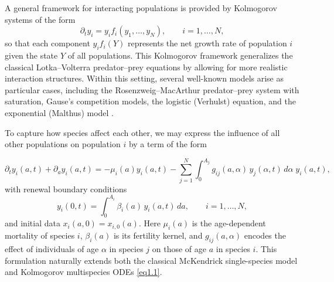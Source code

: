 \documentclass[10pt, a4paper]{amsart}
\theoremstyle{plain}
\theoremstyle{definition}
\theoremstyle{remark}
\numberwithin{equation}{section}
\begin{document}
A general framework for interacting populations is provided by Kolmogorov systems of the form
\begin{equation}\label{eq1.1}
\partial_t y_i= y_i f_i(y_1,\dots,y_N), \qquad i=1,\dots,N,
\end{equation}
so that each component $y_i f_i(Y)$ represents the net growth rate of population $i$ given the state $Y$ of all populations. This Kolmogorov framework generalizes the classical Lotka–Volterra predator–prey equations by allowing for more realistic interaction structures. Within this setting, several well-known models arise as particular cases, including the Rosenzweig–MacArthur predator–prey system with saturation, Gause’s competition models, the logistic (Verhulst) equation, and the exponential (Malthus) model \cite{ref3}.

To capture how species affect each other, we may express the influence of all other populations on population $i$ by a term of the form

\begin{equation}\label{eq1.2}
\partial_t y_i(a,t) + \partial_a y_i(a,t)
= -\mu_i(a)y_i(a,t) - \sum_{j=1}^N \int_0^{A_j} g_{ij}(a,\alpha)\,y_j(\alpha,t)\,d\alpha \; y_i(a,t),
\end{equation}
with renewal boundary conditions
\begin{equation}\label{}
y_i(0,t) = \int_0^{A_i} \beta_i(a)\,y_i(a,t)\,da, \qquad i=1,\dots,N,
\end{equation}
and initial data $x_i(a,0)=x_{i,0}(a)$. Here $\mu_i(a)$ is the age-dependent mortality of species $i$, $\beta_i(a)$ is its fertility kernel, and $g_{ij}(a,\alpha)$ encodes the effect of individuals of age $\alpha$ in species $j$ on those of age $a$ in species $i$. This formulation naturally extends both the classical McKendrick single-species model and Kolmogorov multispecies ODEs \eqref{eq1.1}.
\end{document}

